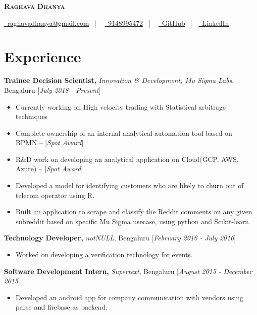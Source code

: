 \documentclass[10pt]{article}
\renewcommand{\textbf}[1]{{\bfseries\color{accent_darkest}#1}}
\begin{document}
\thispagestyle{empty}


\begin{center}
 \textbf{\textsc{\color{anotherred}\Huge Raghava Dhanya}}\\[10pt] %
\end{center}

\begin{center}
 \href{mailto:raghavadhanya@gmail.com}{\faEnvelope\ raghavadhanya@gmail.com}
 \ | \ %
 \href{tel:9148995472}{\faPhoneSquare\ 9148995472} \ | \ %
 \href{https://github.com/RaghavaDhanya}{ \underline{\faGithubSquare\
 GitHub}} \ | \ \href{https://in.linkedin.com/in/raghavadhanya}{\underline
 {\faLinkedinSquare\ LinkedIn}} 
\end{center}


\section*{Experience} 
\textbf{Trainee Decision Scientist,} \textit{Innovation \& Development, Mu Sigma Labs},
 Bengaluru \hfill \textcolor{grey_darker}{[\textit{July 2018 - Present}]}
\begin{itemize}
    \itemsep0em
    \item Currently working on High velocity trading with Statistical arbitrage techniques 
    \item Complete ownership of an internal analytical automation tool based on BPMN  -- [\textit{Spot Award}] 
    \item R\&D work on developing an analytical application on Cloud(GCP, AWS, Azure) -- [\textit{Spot Award}]
    \item Developed a model for identifying customers who are likely to churn out of telecom operator using R.
    \item Built an application to scrape and classify the Reddit comments on any given subreddit based
    on specific Mu Sigma usecase, using python and Scikit-learn.
\end{itemize}
\textbf{Technology Developer,} \textit{notNULL},
Bengaluru \hfill \textcolor{grey_darker}{[\textit{February 2016 - July 2016}]}
\begin{itemize}
    \itemsep0em
    \item Worked on developing a verification technology for events.
\end{itemize}
\medskip
\textbf{Software Development Intern,} \textit{Supertext}, Bengaluru
\hfill \textcolor{grey_darker}{[\textit{August 2015 - December 2015}]}
\begin{itemize}
    \item Developed an android app for company communication with vendors using
    parse and firebase as backend.     
\end{itemize}
\end{document}
